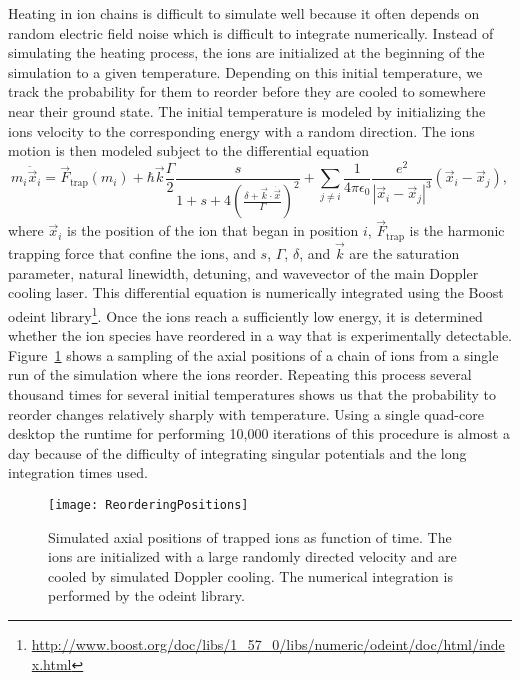 Heating in ion chains is difficult to simulate well because it often depends on random electric field noise which is difficult to integrate numerically.  Instead of simulating the heating process, the ions are initialized at the beginning of the simulation to a given temperature.  Depending on this initial temperature, we track the probability for them to reorder before they are cooled to somewhere near their ground state.  The initial temperature is modeled by initializing the ions velocity to the corresponding energy with a random direction.  The ions motion is then modeled subject to the differential equation
\begin{equation}
	m_i \ddot{\vec{x}}_i = \vec{F}_\mathrm{trap}(m_i) + \hbar \vec{k} \frac{\Gamma}{2} \frac{s}{1 + s + 4 \left( \frac{\delta + \vec{k} \cdot \dot{\vec{x}}}{\Gamma} \right)^2}	+ \sum\limits_{j \ne i} \frac{1}{4 \pi \epsilon_0} \frac{e^2}{ \left| \vec{x}_i - \vec{x}_j \right| ^3 } \left( \vec{x}_i - \vec{x}_j \right) \mathrm{,}
\end{equation}
where $\vec{x}_i$ is the position of the ion that began in position $i$, $\vec{F}_\mathrm{trap}$ is the harmonic trapping force that confine the ions, and $s$, $\Gamma$, $\delta$, and $\vec{k}$ are the saturation parameter, natural linewidth, detuning, and wavevector of the main Doppler cooling laser.  This differential equation is numerically integrated using the Boost odeint library\footnote{\url{http://www.boost.org/doc/libs/1_57_0/libs/numeric/odeint/doc/html/index.html}}.  Once the ions reach a sufficiently low energy, it is determined whether the ion species have reordered in a way that is experimentally detectable.  Figure~\ref{fig:reorderingpos} shows a sampling of the axial positions of a chain of ions from a single run of the simulation where the ions reorder.  Repeating this process several thousand times for several initial temperatures shows us that the probability to reorder changes relatively sharply with temperature.  Using a single quad-core desktop the runtime for performing 10,000 iterations of this procedure is almost a day because of the difficulty of integrating singular potentials and the long integration times used.

\begin{figure}
	\centering
	\texttt{[image: ReorderingPositions]}
	\caption[Simulated axial positions during Doppler recooling]{Simulated axial positions of trapped ions as function of time.  The ions are initialized with a large randomly directed velocity and are cooled by simulated Doppler cooling.  The numerical integration is performed by the odeint library.}
	\label{fig:reorderingpos}
\end{figure}

